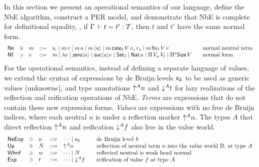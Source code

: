 \documentclass[acmlarge,review,anonymous]{acmart}\settopmatter{printfolios=true}
\begin{document}
In this section we present an operational semantics of our language,
define the NbE algorithm, construct a PER model, and demonstrate that
NbE is complete for definitional equality, \ie, if
$\Gamma \,\vdash t = t' : T$, then $t$ and $t'$ have the same normal form.
\[
\begin{array}{lllll@{\qquad}l}
  \Ne & \ni &
  m & ::= & \ind i \mid m\,v \mid m\,a \mid m\,\ann a \mid
            m\,\case[\ell] V{v_z}{v_s} \mid m\,\fix[\ell] V v
    & \mbox{normal neutral term} \\
  \Nf & \ni &
  v & ::= & m \mid \lambda v \mid \zero a \mid \suc a v \mid
            \Set[\ell] \mid \Nat a \mid \piT {V_u}{V_t} \mid
            \epiT\Size V
    & \mbox{normal form} \\
\end{array}
\]
For the operational semantics,
instead of defining a separate language of values,
we extend the syntax of expressions by de Bruijn levels $\mathsf{x}_{k}$
to be used as generic values (unknowns), and type annotations
$\mathord{\uparrow^{A}} n$ and $\mathord{\downarrow^{A}} t$ for lazy realizations of the
reflection and reification operations of NbE.
\emph{Terms} are expressions that do not contain these new expression
forms. \emph{Values}  are expressions with no free de Bruijn
indices, where each neutral $n$ is under a reflection marker $\mathord{\uparrow^{A}} n$.
The types $A$ that direct reflection $\mathord{\uparrow^{A}} n$ and reification
$\mathord{\downarrow^{A}} f$ also live in the value world.
\[
\begin{array}{lllrl@{\qquad}l}
  \NeExp & \ni & n & ::= & \dots \mid \lev k
    & \mbox{de Bruijn level $k$} \\
  \tUp  & \ni & N & ::= & \up A n
     & \mbox{reflection of neutral term $n$ into the value world $\D$, at
       type $A$} \\
  \Whnf & \ni & w & ::= & \dots \mid N
    & \mbox{reflected neutral is weak head normal} \\
  \Exp  & \ni & t & ::= & \dots \mid \down A f
     & \mbox{reification of value $f$ at type $A$} \\
\end{array}
\]
\end{document}
